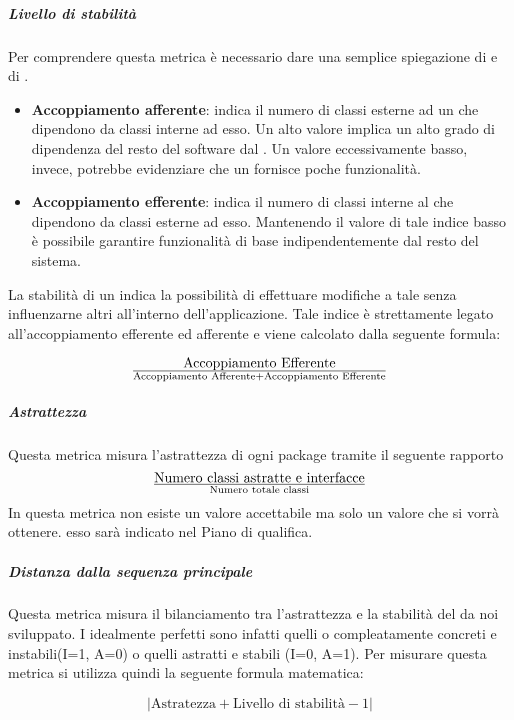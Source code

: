 \subparagraph{Livello di stabilità}
Per comprendere questa metrica è necessario dare una semplice spiegazione di  e di .
\begin{itemize}
\item
\textbf{Accoppiamento afferente}: indica il numero di classi esterne ad un  che dipendono da classi interne ad esso.
Un alto valore implica un alto grado di dipendenza del resto del software dal . Un valore eccessivamente basso, invece, potrebbe evidenziare che un  fornisce poche funzionalità.
\item
\textbf{Accoppiamento efferente}: indica il numero di classi interne al  che dipendono da classi esterne ad esso.
Mantenendo il valore di tale indice basso è possibile garantire funzionalità di base indipendentemente dal resto del sistema.
\end{itemize}

La stabilità di un  indica la possibilità di effettuare modifiche a tale  senza influenzarne altri all'interno dell'applicazione. Tale indice è strettamente legato all'accoppiamento efferente ed afferente e viene calcolato dalla seguente formula:

\begin{displaymath}
{\text{Accoppiamento Efferente}}\over{\text{Accoppiamento Afferente} + \text{Accoppiamento Efferente}}
\end{displaymath}

\subparagraph{Astrattezza}
Questa metrica misura l'astrattezza di ogni package tramite il seguente rapporto 
\begin{displaymath}
{\text{Numero classi astratte e interfacce}}\over{\text{Numero totale classi}}
\end{displaymath}
In questa metrica non esiste un valore accettabile ma solo un valore che si vorrà ottenere. esso sarà indicato nel Piano di qualifica.
\subparagraph{Distanza dalla sequenza principale}
Questa metrica misura il bilanciamento tra l'astrattezza e la stabilità del  da noi sviluppato. I  idealmente perfetti sono infatti quelli o compleatamente concreti e instabili(I=1, A=0) o quelli astratti e stabili (I=0, A=1). Per misurare questa metrica si utilizza quindi la seguente formula matematica:

\begin{displaymath}
{|\text{Astratezza} + \text{Livello di stabilità} - 1|}
\end{displaymath}

